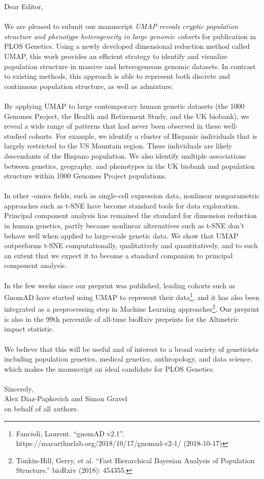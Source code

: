 \documentclass{article}
\begin{document}
Dear Editor,
\\\\
We are pleased to submit our manuscript \emph{UMAP reveals cryptic population structure and phenotype heterogeneity in large genomic cohorts} for publication in PLOS Genetics. Using a newly developed dimensional reduction method called UMAP, this work provides an efficient strategy to identify and visualize population structure in massive and heterogeneous genomic datasets. In contrast to existing methods, this approach is able to represent both discrete and continuous population structure, as well as admixture. 
\\\\
By applying UMAP to large contemporary human genetic datasets (the 1000 Genomes Project, the Health and Retirement Study, and the UK biobank), we reveal a wide range of patterns that had never been observed in these well-studied cohorts. For example, we identify a cluster of Hispanic individuals that is largely restricted to the US Mountain region. These individuals are likely descendants of the Hispano population. We also identify multiple associations between genetics, geography, and phenotypes in the UK biobank and population structure within 1000 Genomes Project populations.
\\\\  
In other -omics fields, such as single-cell expression data, nonlinear nonparametric approaches such as t-SNE have become standard tools for data exploration. Principal component analysis has remained the standard for dimension reduction in human genetics, partly because nonlinear alternatives such as t-SNE don't behave well when applied to large-scale genetic data. We show that UMAP outperforms t-SNE computationally, qualitatively and quantitatively, and to such an extent that we expect it to become a standard companion to principal component analysis. 
\\\\
In the few weeks since our preprint was published, leading cohorts such as GnomAD have started using UMAP to represent their data\footnote{Fancioli, Laurent. ``gnomAD v2.1''. https://macarthurlab.org/2018/10/17/gnomad-v2-1/ (2018-10-17)}, and it has also been integrated as a preprocessing step in Machine Learning approaches\footnote{Tonkin-Hill, Gerry, et al. ``Fast Hierarchical Bayesian Analysis of Population Structure.'' bioRxiv (2018): 454355.}. Our preprint is also in the 99th percentile of all-time bioRxiv preprints for the Altmetric impact statistic. 
\\\\
We believe that this will be useful and of interest to a broad variety of geneticists including population genetics, medical genetics, anthropology, and data science, which makes the manuscript an ideal candidate for PLOS Genetics.
\\
\\
Sincerely,
\\
Alex Diaz-Papkovich and Simon Gravel
\\
on behalf of all authors.
\end{document}
